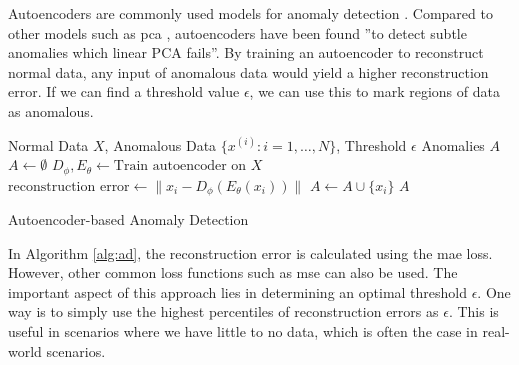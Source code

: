 Autoencoders are commonly used models for anomaly detection \cite{an2015variational, zhou2017anomaly}. Compared to other models such as \acrfull{pca} \cite{wold1987principal}, autoencoders have been found ''to detect subtle anomalies which linear PCA fails''\cite{sakurada2014anomaly}. By training an autoencoder to reconstruct normal data, any input of anomalous data would yield a higher reconstruction error. If we can find a threshold value $\epsilon$, we can use this to mark regions of data as anomalous. 
\begin{algorithm}[!h]
\begin{algorithmic}[1]
\small
\Require Normal Data $X$, Anomalous Data $\{x^{(i)} : i = 1, \ldots, N\}$, Threshold $\epsilon$
\Ensure Anomalies $A$
\State $A \gets \emptyset$
\State $D_\phi, E_\theta \gets \text{Train autoencoder on } X$
    \State $\text{reconstruction error} \gets \|x_i - D_\phi(E_\theta(x_i))\|$
        \State $A \gets A \cup \{x_i\}$
    \EndIf
\EndFor
\State \Return $A$
\end{algorithmic}
\caption{Autoencoder-based Anomaly Detection}
\label{alg:ad}
\end{algorithm}
In Algorithm \ref{alg:ad}, the reconstruction error is calculated using the \acrshort{mae} loss. However, other common loss functions such as \acrshort{mse} can also be used. The important aspect of this approach lies in determining an optimal threshold $\epsilon$. One way is to simply use the highest percentiles of reconstruction errors as $\epsilon$. This is useful in scenarios where we have little to no data, which is often the case in real-world scenarios.


